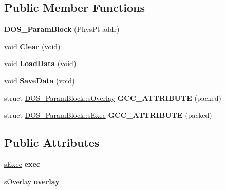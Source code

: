 \subsection*{Public Member Functions}
\begin{DoxyCompactItemize}
\item 
\hypertarget{classDOS__ParamBlock_af9c5e6e9379c3fcb24def7ba9c7af9de}{{\bfseries D\-O\-S\-\_\-\-Param\-Block} (Phys\-Pt addr)}\label{classDOS__ParamBlock_af9c5e6e9379c3fcb24def7ba9c7af9de}

\item 
\hypertarget{classDOS__ParamBlock_aa842f9a32d70301571b799a9da9f1b64}{void {\bfseries Clear} (void)}\label{classDOS__ParamBlock_aa842f9a32d70301571b799a9da9f1b64}

\item 
\hypertarget{classDOS__ParamBlock_a104d763715c0d58f6e94b088087f4f8b}{void {\bfseries Load\-Data} (void)}\label{classDOS__ParamBlock_a104d763715c0d58f6e94b088087f4f8b}

\item 
\hypertarget{classDOS__ParamBlock_a066b79588de8b72bad774b18912d4858}{void {\bfseries Save\-Data} (void)}\label{classDOS__ParamBlock_a066b79588de8b72bad774b18912d4858}

\item 
\hypertarget{classDOS__ParamBlock_afa64b22f01b5f982ce1782176b11bc22}{struct \hyperlink{structDOS__ParamBlock_1_1sOverlay}{D\-O\-S\-\_\-\-Param\-Block\-::s\-Overlay} {\bfseries G\-C\-C\-\_\-\-A\-T\-T\-R\-I\-B\-U\-T\-E} (packed)}\label{classDOS__ParamBlock_afa64b22f01b5f982ce1782176b11bc22}

\item 
\hypertarget{classDOS__ParamBlock_ab6a8cac7fa1aa818c069cf07e7857b44}{struct \hyperlink{structDOS__ParamBlock_1_1sExec}{D\-O\-S\-\_\-\-Param\-Block\-::s\-Exec} {\bfseries G\-C\-C\-\_\-\-A\-T\-T\-R\-I\-B\-U\-T\-E} (packed)}\label{classDOS__ParamBlock_ab6a8cac7fa1aa818c069cf07e7857b44}

\end{DoxyCompactItemize}
\subsection*{Public Attributes}
\begin{DoxyCompactItemize}
\item 
\hypertarget{classDOS__ParamBlock_a9ae3a22f1c1e051d73a4f312604975d0}{\hyperlink{structDOS__ParamBlock_1_1sExec}{s\-Exec} {\bfseries exec}}\label{classDOS__ParamBlock_a9ae3a22f1c1e051d73a4f312604975d0}

\item 
\hypertarget{classDOS__ParamBlock_a51e2ef25f0ca8f9b9e8dc4bafce0a78b}{\hyperlink{structDOS__ParamBlock_1_1sOverlay}{s\-Overlay} {\bfseries overlay}}\label{classDOS__ParamBlock_a51e2ef25f0ca8f9b9e8dc4bafce0a78b}

\end{DoxyCompactItemize}


